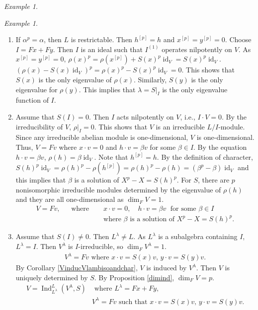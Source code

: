 \documentclass[12pt,MSc]{muthesis_2023}
\theoremstyle{plain}%
\theoremstyle{definition}
\theoremstyle{remark}
\newtheorem{Example}[FactCounter]{Example} %
\DeclareMathOperator{\id}{id}
\DeclareMathOperator{\Ind}{Ind}
\begin{document}
\begin{Example}
\begin{enumerate}
\begin{Example}
\begin{enumerate}
\item[(a)] If $\alpha^p=\alpha$, then $L$ is restrictable. Then $h^{[p]}=h$ and $x^{[p]}=y^{[p]}=0$. Choose $I=Fx+Fy$. Then $I$ is an ideal such that $I^{(1)}$ operates nilpotently on $V$. As $x^{[p]}=y^{[p]}=0$, ${\rho(x)}^p=\rho(x^{[p]})+{S(x)}^p\id_V={S(x)}^p\id_V$. ${(\rho(x)-S(x)\id_V)}^p={\rho(x)}^p-{S(x)}^p\id_V=0$. This shows that $S(x)$ is the only eigenvalue of $\rho(x)$. Similarly, $S(y)$ is the only eigenvalue for $\rho(y)$. This implies that $\lambda=S|_I$ is the only eigenvalue function of $I$.
\item[(a.1)] Assume that $S(I)=0$. Then $I$ acts nilpotently on $V$, i.e., $I\cdot V=0$. By the irreducibility of $V$, $\rho|_I=0$. This shows that $V$ is an irreducible $L/I$-module. Since any irreducible abelian module is one-dimensional, $V$ is one-dimensional. Thus, $V=Fv$ where $x \cdot v=0$ and $h\cdot v=\beta v$ for some $\beta\in I$. By the equation $h\cdot v=\beta v$, $\rho(h)=\beta \id_V$. Note that $h^{[p]}=h$. By the definition of character, ${S(h)}^p\id_V={\rho(h)}^p-\rho(h^{[p]})={\rho(h)}^p-\rho(h)=(\beta^p-\beta)\id_V$ and this implies that $\beta$ is a solution of $X^p-X={S(h)}^p$. For $S$, there are $p$ nonisomorphic irreducible modules determined by the eigenvalue of $\rho(h)$ and they are all one-dimensional as $\dim_FV=1$.
\begin{align*}
V=Fv,\;\;\quad\text{where} \; \quad& x \cdot v=0,\quad h\cdot v=\beta v \;\text{  for some }\beta\in I\\
&\text{where $\beta$ is a solution of $X^p-X={S(h)}^p$.}
\end{align*}

\item[(a.2)] Assume that $S(I)\neq 0$. Then $L^{\lambda}\neq L$. As $L^{\lambda}$ is a subalgebra containing $I$, $L^{\lambda}=I$. Then $V^{\lambda}$ is $I$-irreducible, so $\dim_FV^{\lambda}=1$.
\begin{align*}
\text{$V^{\lambda}=Fv$ where $x\cdot v=S(x)v$, $y \cdot v=S(y)v$.}
\end{align*}
By Corollary \ref{VinducVlambisoandchar}, $V$ is induced by $V^{\lambda}$. Then $V$ is uniquely determined by $S$. By Proposition \ref{dimind}, $\dim_FV=p$.
\begin{align*}
\text{$V=\Ind^L_{L^{\lambda}}(V^{\lambda}, S)$}& \text{ where $L^{\lambda}=Fx+Fy$},\\
&\text{$V^{\lambda}=Fv$ such that $x \cdot v=S(x)v$, $y\cdot v =S(y)v$.}
\end{align*}


\end{enumerate}
\end{Example}
\end{enumerate}
\end{Example}
\end{document}

